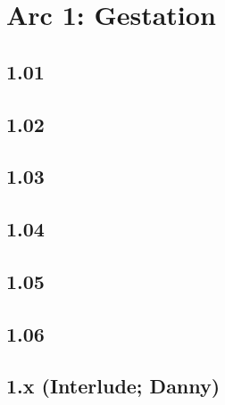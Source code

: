 \part*{Arc 1: Gestation}
 \chapter*{1.01}
 \chapter*{1.02}
 \chapter*{1.03}
 \chapter*{1.04}
 \chapter*{1.05}
 \chapter*{1.06}
 \chapter*{1.x (Interlude; Danny)}








